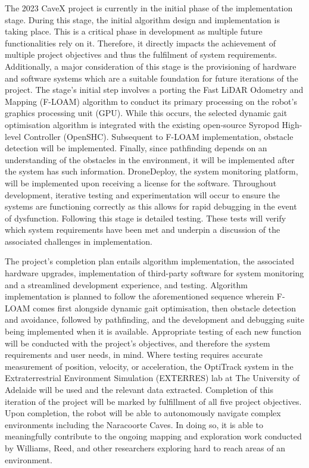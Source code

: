 The 2023 CaveX project is currently in the initial phase of the implementation stage. During this stage, the initial algorithm design and implementation is taking place. This is a critical phase in development as multiple future functionalities rely on it. Therefore, it directly impacts the achievement of multiple project objectives and thus the fulfilment of system requirements. Additionally, a major consideration of this stage is the provisioning of hardware and software systems which are a suitable foundation for future iterations of the project. The stage's initial step involves a porting the Fast LiDAR Odometry and Mapping (F-LOAM) algorithm to conduct its primary processing on the robot's graphics processing unit (GPU). While this occurs, the selected dynamic gait optimisation algorithm is integrated with the existing open-source Syropod High-level Controller (OpenSHC). Subsequent to F-LOAM implementation, obstacle detection will be implemented. Finally, since pathfinding depends on an understanding of the obstacles in the environment, it will be implemented after the system has such information. DroneDeploy, the system monitoring platform, will be implemented upon receiving a license for the software. Throughout development, iterative testing and experimentation will occur to ensure the systems are functioning correctly as this allows for rapid debugging in the event of dysfunction. Following this stage is detailed testing. These tests will verify which system requirements have been met and underpin a discussion of the associated challenges in implementation.

The project's completion plan entails algorithm implementation, the associated hardware upgrades, implementation of third-party software for system monitoring and a streamlined development experience, and testing. Algorithm implementation is planned to follow the aforementioned sequence wherein F-LOAM comes first alongside dynamic gait optimisation, then obstacle detection and avoidance, followed by pathfinding, and the development and debugging suite being implemented when it is available. Appropriate testing of each new function will be conducted with the project's objectives, and therefore the system requirements and user needs, in mind. Where testing requires accurate measurement of position, velocity, or acceleration, the OptiTrack system in the Extraterrestrial Environment Simulation (EXTERRES) lab at The University of Adelaide will be used and the relevant data extracted. Completion of this iteration of the project will be marked by fulfillment of all five project objectives. Upon completion, the robot will be able to autonomously navigate complex environments including the Naracoorte Caves. In doing so, it is able to meaningfully contribute to the ongoing mapping and exploration work conducted by Williams, Reed, and other researchers exploring hard to reach areas of an environment.